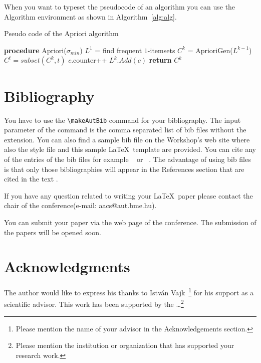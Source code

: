 \documentclass[twoside,b5paper,10pt]{article}
\begin{document}
When you want to typeset the pseudocode of an algorithm you can use
the Algorithm environment as shown in Algorithm~\ref{alg:alg}.

\begin{algorithm}
  \caption{Pseudo code of the Apriori algorithm}
\begin{algorithmic}[1]
\label{alg:alg}
 \STATE \textbf{procedure} Apriori($\sigma_{min}$)
 \STATE $L^{1}$ = find frequent $1$-itemsets
 \STATE $C^{k}$ = AprioriGen($L^{k-1}$)
 \STATE $C^{t} = subset(C^{k},t)$
 \STATE $c$.counter++
 \STATE $L^{k}.Add(c)$
 \ENDIF
 \ENDFOR
 \ENDFOR
 \ENDFOR
 \ENDFOR
 \STATE \textbf{return} $C^{k}$

\end{algorithmic}
\end{algorithm}


\section{Bibliography}
\label{sec:bib}

You have to use the \verb|\makeAutBib| command for your
bibliography. The input parameter of the command is the comma
separated list of bib files without the extension. You can also find
a sample bib file on the Workshop's web site where also the style
file and this sample \LaTeX \ template are provided. You can cite
any of the entries of the bib files for example ~\cite{ han00mining}
or ~\cite{burdick01mafia}. The advantage of using bib files is that
only those bibliographies will appear in the References section that
are cited in the text \cite{proba}.

If you have any question related to writing your \LaTeX \ paper
please contact the chair of the conference(e-mail: aacs@aut.bme.hu).

You can submit your paper via the web page of the conference. The
submission of the papers will be opened soon.

\section*{Acknowledgments}
 { \small The author would like to express his thanks to István Vajk~\footnote{Please mention the name of your advisor in the
Acknowledgements section. } for his support as a scientific advisor.
This work has been supported by the \dots \footnote{Please mention
the institution or organization that has supported your research
work.} }

\end{document}
